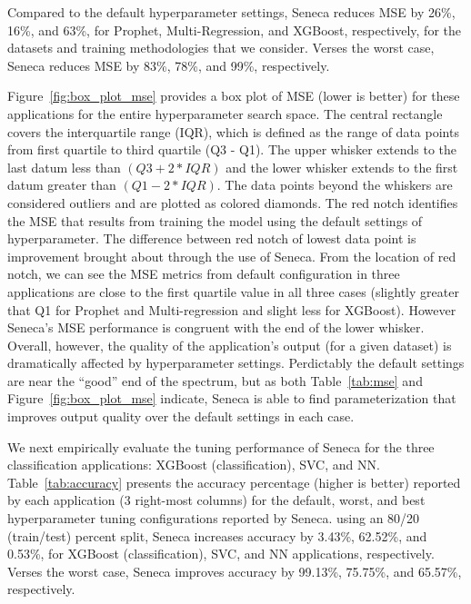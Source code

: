Compared to the default hyperparameter settings,
Seneca reduces MSE by 26\%, 16\%, and 63\%, for Prophet, Multi-Regression, and XGBoost,
respectively, for the datasets and training methodologies that we consider.
Verses the worst case, Seneca reduces MSE by 83\%, 78\%, and 99\%, respectively.

Figure~\ref{fig:box_plot_mse} provides a box plot of MSE (lower is better) for
these applications for the entire hyperparameter search space. The central
rectangle covers the interquartile range (IQR), which is defined as the range
of data points from first quartile to third quartile (Q3 - Q1).  The upper
whisker extends to the last datum less than \texttt{$(Q3 + 2 * IQR)$} and the
lower whisker extends to the first datum greater than \texttt{$(Q1 - 2 *
IQR)$}. The data points beyond the whiskers are considered outliers and are
plotted as colored diamonds. The red notch identifies the MSE that results
from training the model using the default settings of hyperparameter. The
difference between red notch of lowest data point is improvement brought about
through the use of Seneca. From the location of red notch, we can see the MSE
metrics from default configuration in three applications are close to the
first quartile value in all three cases (slightly greater that Q1 for Prophet
and Multi-regression and slight less for XGBoost).  However Seneca's MSE
performance is congruent with the end of the lower whisker.  Overall, however,
the quality of the application's output (for a given dataset) is dramatically
affected by hyperparameter settings.  Perdictably the default settings are
near the ``good'' end of the spectrum, but as both Table~\ref{tab:mse} and
Figure~\ref{fig:box_plot_mse} indicate, Seneca is able to find
parameterization that improves output quality over the default settings
in each case.

We next empirically evaluate the tuning performance of Seneca for the three
classification applications: XGBoost (classification), SVC, and NN.
Table~\ref{tab:accuracy} presents the accuracy percentage (higher is
better) reported by each application (3 right-most columns) for the default,
worst, and best hyperparameter tuning configurations reported by Seneca.
using an 80/20 (train/test) percent split,
Seneca increases accuracy by 3.43\%, 62.52\%, and 0.53\%, for XGBoost
(classification), SVC, and NN applications, respectively.  Verses
the worst case, Seneca improves accuracy by 99.13\%, 75.75\%, and 65.57\%,
respectively.



